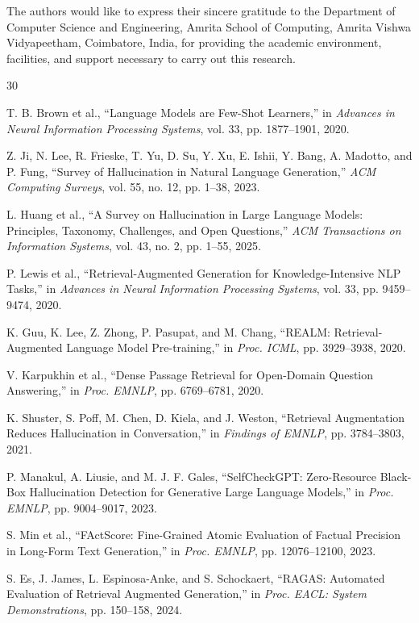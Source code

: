 \documentclass[conference]{IEEEtran}
\begin{document}
The authors would like to express their sincere gratitude to the Department of Computer Science and Engineering, Amrita School of Computing, Amrita Vishwa Vidyapeetham, Coimbatore, India, for providing the academic environment, facilities, and support necessary to carry out this research.


\begin{thebibliography}{30}

T. B. Brown et al., ``Language Models are Few-Shot Learners,'' in \emph{Advances in Neural Information Processing Systems}, vol. 33, pp. 1877--1901, 2020.

Z. Ji, N. Lee, R. Frieske, T. Yu, D. Su, Y. Xu, E. Ishii, Y. Bang, A. Madotto, and P. Fung, ``Survey of Hallucination in Natural Language Generation,'' \emph{ACM Computing Surveys}, vol. 55, no. 12, pp. 1--38, 2023.

L. Huang et al., ``A Survey on Hallucination in Large Language Models: Principles, Taxonomy, Challenges, and Open Questions,'' \emph{ACM Transactions on Information Systems}, vol. 43, no. 2, pp. 1--55, 2025.

P. Lewis et al., ``Retrieval-Augmented Generation for Knowledge-Intensive NLP Tasks,'' in \emph{Advances in Neural Information Processing Systems}, vol. 33, pp. 9459--9474, 2020.

K. Guu, K. Lee, Z. Zhong, P. Pasupat, and M. Chang, ``REALM: Retrieval-Augmented Language Model Pre-training,'' in \emph{Proc. ICML}, pp. 3929--3938, 2020.

V. Karpukhin et al., ``Dense Passage Retrieval for Open-Domain Question Answering,'' in \emph{Proc. EMNLP}, pp. 6769--6781, 2020.

K. Shuster, S. Poff, M. Chen, D. Kiela, and J. Weston, ``Retrieval Augmentation Reduces Hallucination in Conversation,'' in \emph{Findings of EMNLP}, pp. 3784--3803, 2021.

P. Manakul, A. Liusie, and M. J. F. Gales, ``SelfCheckGPT: Zero-Resource Black-Box Hallucination Detection for Generative Large Language Models,'' in \emph{Proc. EMNLP}, pp. 9004--9017, 2023.

S. Min et al., ``FActScore: Fine-Grained Atomic Evaluation of Factual Precision in Long-Form Text Generation,'' in \emph{Proc. EMNLP}, pp. 12076--12100, 2023.

S. Es, J. James, L. Espinosa-Anke, and S. Schockaert, ``RAGAS: Automated Evaluation of Retrieval Augmented Generation,'' in \emph{Proc. EACL: System Demonstrations}, pp. 150--158, 2024.


\end{thebibliography}
\end{document}
